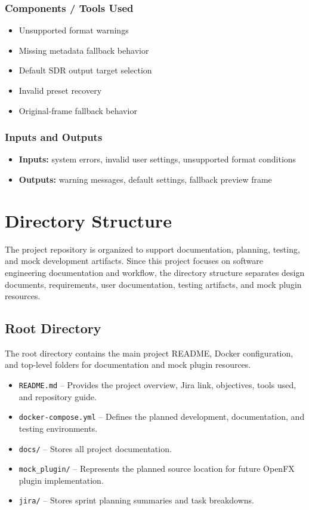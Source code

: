 \documentclass{article}
\begin{document}
\subsubsection*{Components / Tools Used}
\begin{itemize}
    \item Unsupported format warnings
    \item Missing metadata fallback behavior
    \item Default SDR output target selection
    \item Invalid preset recovery
    \item Original-frame fallback behavior
\end{itemize}

\subsubsection*{Inputs and Outputs}
\begin{itemize}
    \item \textbf{Inputs:} system errors, invalid user settings, unsupported format conditions
    \item \textbf{Outputs:} warning messages, default settings, fallback preview frame
\end{itemize}

\section{Directory Structure}

The project repository is organized to support documentation, planning, testing, and mock development artifacts. Since this project focuses on software engineering documentation and workflow, the directory structure separates design documents, requirements, user documentation, testing artifacts, and mock plugin resources.

\subsection{Root Directory}
The root directory contains the main project README, Docker configuration, and top-level folders for documentation and mock plugin resources.

\begin{itemize}
    \item \texttt{README.md} -- Provides the project overview, Jira link, objectives, tools used, and repository guide.
    \item \texttt{docker-compose.yml} -- Defines the planned development, documentation, and testing environments.
    \item \texttt{docs/} -- Stores all project documentation.
    \item \texttt{mock\_plugin/} -- Represents the planned source location for future OpenFX plugin implementation.
    \item \texttt{jira/} -- Stores sprint planning summaries and task breakdowns.
\end{itemize}
\end{document}
